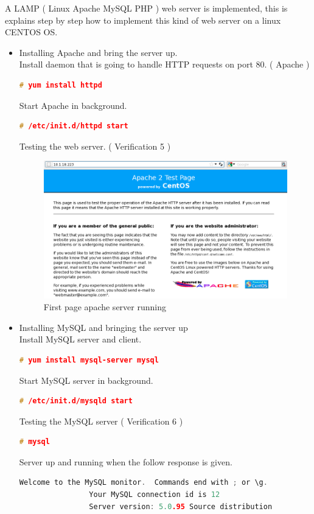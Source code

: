 A LAMP ( Linux Apache MySQL PHP ) web server is implemented, this is explains step by step how to implement this kind of web server on a linux CENTOS OS.
\begin{itemize}
		\item Installing Apache and bring the server up.\\
			Install daemon that is going to handle HTTP requests on port 80. ( Apache )
			\begin{lstlisting}[language=c, stepnumber=0, tabsize=1]
				# yum install httpd
			\end{lstlisting}
			Start Apache in background.
			\begin{lstlisting}[language=c, stepnumber=0, tabsize=1]
				# /etc/init.d/httpd start
			\end{lstlisting}			
			Testing the web server. ( Verification 5 )
			\begin{figure}[H]
				\begin{centering}
					\includegraphics[width=1.0\textwidth]{images/first_web.png}
					\caption{First page apache server running}
				\end{centering}
			\end{figure}
		\item Installing MySQL and bringing the server up\\
			Install MySQL server and client.
			\begin{lstlisting}[language=c, stepnumber=0, tabsize=1]
				# yum install mysql-server mysql
			\end{lstlisting}
			Start MySQL server in background.
			\begin{lstlisting}[language=c, stepnumber=0, tabsize=1]
				# /etc/init.d/mysqld start
			\end{lstlisting}
			Testing the MySQL server ( Verification 6 )
			\begin{lstlisting}[language=c, stepnumber=0, tabsize=1]
				# mysql
			\end{lstlisting}
			Server up and running when the follow response is given.
			\begin{lstlisting}[language=c, stepnumber=0, tabsize=1]
				Welcome to the MySQL monitor.  Commands end with ; or \g.
				Your MySQL connection id is 12
				Server version: 5.0.95 Source distribution


\end{lstlisting}
\end{itemize}

